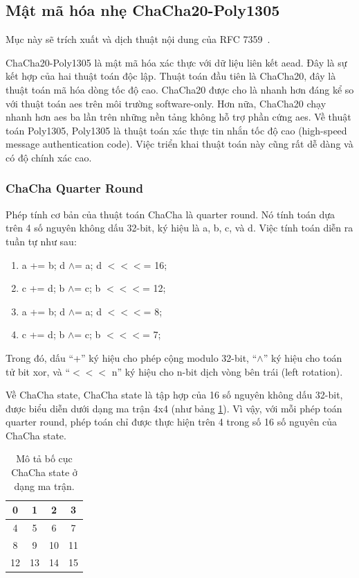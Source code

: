 \subsection{Mật mã hóa nhẹ ChaCha20-Poly1305}

Mục này sẽ trích xuất và dịch thuật nội dung của RFC 7359~\cite{rfc7539}.

ChaCha20-Poly1305 là mật mã hóa xác thực với dữ liệu liên kết \acrfull{aead}. Đây là sự kết hợp của hai thuật toán độc lập. Thuật toán đầu tiên là ChaCha20, đây là thuật toán mã hóa dòng tốc độ cao. ChaCha20 được cho là nhanh hơn đáng kể so với thuật toán \acrfull{aes} trên môi trường software-only. Hơn nữa, ChaCha20 chạy nhanh hơn \acrshort{aes} ba lần trên những nền tảng không hỗ trợ phần cứng \acrshort{aes}. Về thuật toán Poly1305, Poly1305 là thuật toán xác thực tin nhắn tốc độ cao (high-speed message authentication code). Việc triển khai thuật toán này cũng rất dễ dàng và có độ chính xác cao.

\subsubsection{ChaCha Quarter Round}

Phép tính cơ bản của thuật toán ChaCha là quarter round. Nó tính toán dựa trên 4 số nguyên không dấu 32-bit, ký hiệu là a, b, c, và d. Việc tính toán diễn ra tuần tự như sau:

\begin{enumerate}
    \item a += b; d $\wedge$= a; d $<<<$= 16;
    \item c += d; b $\wedge$= c; b $<<<$= 12;
    \item a += b; d $\wedge$= a; d $<<<$= 8;
    \item c += d; b $\wedge$= c; b $<<<$= 7;
\end{enumerate}

Trong đó, dấu ``+'' ký hiệu cho phép cộng modulo 32-bit, ``$\wedge$'' ký hiệu cho toán tử bit \acrfull{xor}, và ``$<<<$ n'' ký hiệu cho n-bit dịch vòng bên trái (left rotation).

Về ChaCha state, ChaCha state là tập hợp của 16 số nguyên không dấu 32-bit, được biểu diễn dưới dạng ma trận 4x4 (như bảng \ref{tab:CC20-State-Pos}). Vì vậy, với mỗi phép toán quarter round, phép toán chỉ được thực hiện trên 4 trong số 16 số nguyên của ChaCha state.

\begin{table}[ht]
\caption{Mô tả bố cục ChaCha state ở dạng ma trận.}

\label{tab:CC20-State-Pos}%
\begin{center}
\begin{tabular}{|c|c|c|c|}
\hline
0  & 1  & 2  & 3  \\ \hline
4  & 5  & 6  & 7  \\ \hline
8  & 9  & 10 & 11 \\ \hline
12 & 13 & 14 & 15 \\ \hline
\end{tabular}
\end{center}
\end{table}

